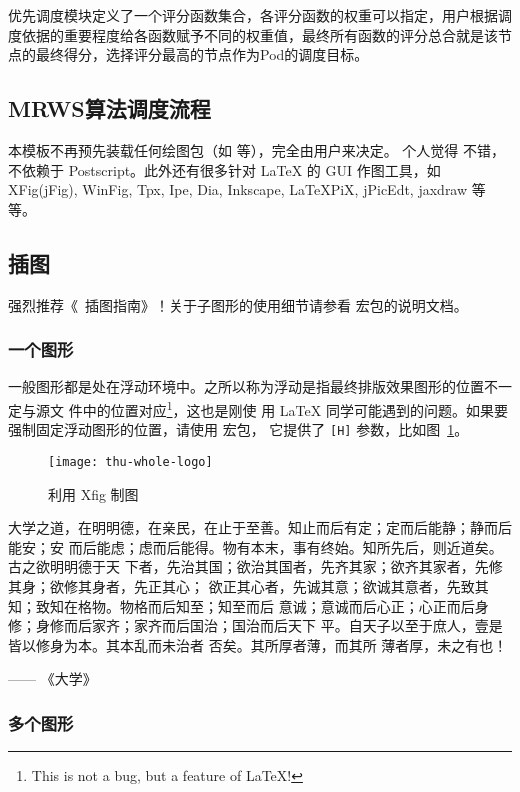 优先调度模块定义了一个评分函数集合，各评分函数的权重可以指定，用户根据调度依据的重要程度给各函数赋予不同的权重值，最终所有函数的评分总合就是该节点的最终得分，选择评分最高的节点作为Pod的调度目标。

\subsection{MRWS算法调度流程}




本模板不再预先装载任何绘图包（如  等），完全由用户来决定。
个人觉得  不错，不依赖于 Postscript。此外还有很多针对 \LaTeX{} 的
 GUI 作图工具，如 XFig(jFig), WinFig, Tpx, Ipe, Dia, Inkscape, LaTeXPiX,
jPicEdt, jaxdraw 等等。

\subsection{插图}
\label{sec:graphs}

强烈推荐《\LaTeXe\ 插图指南》！关于子图形的使用细节请参看  宏包的说明文档。

\subsubsection{一个图形}
\label{sec:onefig}
一般图形都是处在浮动环境中。之所以称为浮动是指最终排版效果图形的位置不一定与源文
件中的位置对应\footnote{This is not a bug, but a feature of \LaTeX!}，这也是刚使
用 \LaTeX{} 同学可能遇到的问题。如果要强制固定浮动图形的位置，请使用  宏包，
它提供了 \texttt{[H]} 参数，比如图~\ref{fig:xfig1}。
\begin{figure}[H] %
  \centering
  \texttt{[image: thu-whole-logo]}
  \caption{利用 Xfig 制图}
  \label{fig:xfig1}
\end{figure}

大学之道，在明明德，在亲民，在止于至善。知止而后有定；定而后能静；静而后能安；安
而后能虑；虑而后能得。物有本末，事有终始。知所先后，则近道矣。古之欲明明德于天
下者，先治其国；欲治其国者，先齐其家；欲齐其家者，先修其身；欲修其身者，先正其心；
欲正其心者，先诚其意；欲诚其意者，先致其知；致知在格物。物格而后知至；知至而后
意诚；意诚而后心正；心正而后身 修；身修而后家齐；家齐而后国治；国治而后天下
平。自天子以至于庶人，壹是皆以修身为本。其本乱而未治者 否矣。其所厚者薄，而其所
薄者厚，未之有也！

\hfill —— 《大学》


\subsubsection{多个图形}
\label{sec:multifig}

